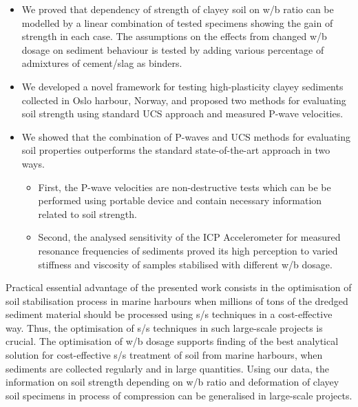 \documentclass[information,article,submit,pdftex,moreauthors]{Definitions/mdpi}
\begin{document}
\begin{itemize}
  \item We proved that dependency of strength of clayey soil on w/b ratio can be modelled by a linear combination of tested specimens showing the gain of strength in each case. The assumptions on the effects from changed w/b dosage on sediment behaviour is tested by adding various percentage of admixtures of cement/slag as binders.
  \item We developed a novel framework for testing high-plasticity clayey sediments collected in Oslo harbour, Norway, and proposed two methods for evaluating soil strength using standard UCS approach and measured P-wave velocities. 
  \item We showed that the combination of P-waves and UCS methods for evaluating soil properties outperforms the standard state-of-the-art approach in two ways. 
  	\begin{itemize}
  		\item First, the P-wave velocities are non-destructive tests which can be be performed using portable device and contain necessary information related to soil strength. 
		\item Second, the analysed sensitivity of the ICP Accelerometer for measured resonance frequencies of sediments proved its high perception to varied stiffness and viscosity of samples stabilised with different w/b dosage.
	\end{itemize}
\end{itemize}

Practical essential advantage of the presented work consists in the optimisation of soil stabilisation process in marine harbours when millions of tons of the dredged sediment material should be processed using s/s techniques in a cost-effective way. Thus, the optimisation of s/s techniques in such large-scale projects is crucial. The optimisation of w/b dosage supports finding of the best analytical solution for cost-effective s/s treatment of soil from marine harbours, when sediments are collected regularly and in large quantities. Using our data, the information on soil strength depending on w/b ratio and deformation of clayey soil specimens in process of compression can be generalised in large-scale projects. 

\end{document}
